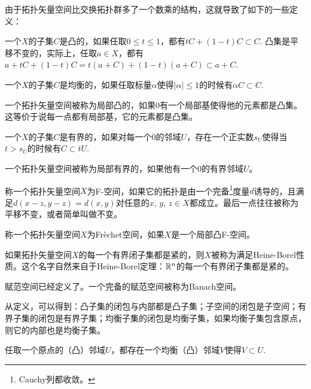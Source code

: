 \begin{para}
由于拓扑矢量空间比交换拓扑群多了一个数乘的结构，这就导致了如下的一些定义：
\begin{compactenum}
\item 一个$X$的子集$C$是凸的，如果任取$0\leq t\leq 1$，都有$tC+(1-t)C\subset C$. 凸集是平移不变的，实际上，任取$a\in X$，都有$a+tC+(1-t)C=t(a+C)+(1-t)(a+C)\subset a+C$.

\item 一个$X$的子集$C$是均衡的，如果任取标量$\alpha$使得$|\alpha|\leq 1$的时候有$\alpha C\subset C$.

\item 一个拓扑矢量空间被称为局部凸的，如果$0$有一个局部基使得他的元素都是凸集。这等价于说每一点都有局部基，它的元素都是凸集。

\item 一个$X$的子集$C$是有界的，如果对每一个$0$的邻域$U$，存在一个正实数$s_U$使得当$t>s_U$的时候有$C\subset tU$.

\item 一个拓扑矢量空间被称为局部有界的，如果他有一个$0$的有界邻域$U$。

\item 称一个拓扑矢量空间$X$为F-空间，如果它的拓扑是由一个完备\footnote{Cauchy列都收敛。}度量$d$诱导的，且满足$d(x-z,y-z)=d(x,y)$对任意的$x$, $y$, $z\in X$都成立。最后一点往往被称为平移不变，或者简单叫做不变。

\item 称一个拓扑矢量空间$X$为Fr\`{e}chet空间，如果$X$是一个局部凸F-空间。

\item 如果拓扑矢量空间$X$的每一个有界闭子集都是紧的，则$X$被称为满足Heine-Borel性质。这个名字自然来自于Heine-Borel定理：$\mathbb{R}^n$的每一个有界闭子集都是紧的。

\item 赋范空间已经定义了。一个完备的赋范空间被称为Banach空间。
\end{compactenum}

从定义，可以得到：凸子集的闭包与内部都是凸子集；子空间的闭包是子空间；有界子集的闭包是有界子集；均衡子集的闭包是均衡子集，如果均衡子集包含原点，则它的内部也是均衡子集。
\end{para}

\begin{pro}
任取一个原点的（凸）邻域$U$，都存在一个均衡（凸）邻域$V$使得$V\subset U$. 
\end{pro}

